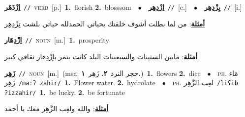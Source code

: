 \documentclass[10pt,a4paper,twoside]{article} %
\begin{document}
\begin{multicols}{2}
{\setlength\topsep{0pt}\textbf{\foreignlanguage{arabic}{اِزْدَهَر}}\ {\color{gray}\texttt{//}\color{black}}\ \textsc{verb}\ [p.]\ \textbf{1.}~florish  \textbf{2.}~blosssom\ \ $\bullet$\ \ \setlength\topsep{0pt}\textbf{\foreignlanguage{arabic}{اِزْدِهِر}}\ {\color{gray}\texttt{//}\color{black}}\ [c.]\ \ $\bullet$\ \ \setlength\topsep{0pt}\textbf{\foreignlanguage{arabic}{يِزْدِهِر}}\ {\color{gray}\texttt{//}\color{black}}\ [i.]\  \begin{flushright}\color{gray}\foreignlanguage{arabic}{\textbf{\underline{\foreignlanguage{arabic}{أمثلة}}}: من لما بطلت أشوف خلقتك بحياتي الحمدلله حياتي بلشت تِزْدِهِر}\end{flushright}\color{black}} \vspace{2mm}

{\setlength\topsep{0pt}\textbf{\foreignlanguage{arabic}{اِزْدِهَار}}\ {\color{gray}\texttt{//}\color{black}}\ \textsc{noun}\ [m.]\ \textbf{1.}~prosperity\  \begin{flushright}\color{gray}\foreignlanguage{arabic}{\textbf{\underline{\foreignlanguage{arabic}{أمثلة}}}: مابين الستينات والسبعينات البلد كانت بتمر باِزْدِهار ثقافي كبير}\end{flushright}\color{black}} \vspace{2mm}

{\setlength\topsep{0pt}\textbf{\foreignlanguage{arabic}{زَهِر}}\ {\color{gray}\texttt{//}\color{black}}\ \textsc{noun}\ [m.]\ \color{gray}(msa. \foreignlanguage{arabic}{حجر النرد}~\foreignlanguage{arabic}{\textbf{٢.}}  \foreignlanguage{arabic}{زَهِر}~\foreignlanguage{arabic}{\textbf{١.}})\color{black}\ \textbf{1.}~flowers  \textbf{2.}~dice\ \ $\bullet$\ \ \textsc{ph.} \color{gray} \foreignlanguage{arabic}{مَاء زَهِر}\color{black}\ {\color{gray}\texttt{/{\sffamily maːʔ zahir}/}\color{black}}\ \textbf{1.}~Flower water.  \textbf{2.}~hydrolate\ \ $\bullet$\ \ \textsc{ph.} \color{gray} \foreignlanguage{arabic}{لعِب الزَّهِر}\color{black}\ {\color{gray}\texttt{/{\sffamily liʕib ʔizzahir}/}\color{black}}\ \textbf{1.}~be lucky.  \textbf{2.}~be fortunate\  \begin{flushright}\color{gray}\foreignlanguage{arabic}{\textbf{\underline{\foreignlanguage{arabic}{أمثلة}}}: والله ولعِب الزَّهِر معك يا أحمد}\end{flushright}\color{black}} \vspace{2mm}


\end{multicols}
\end{document}
